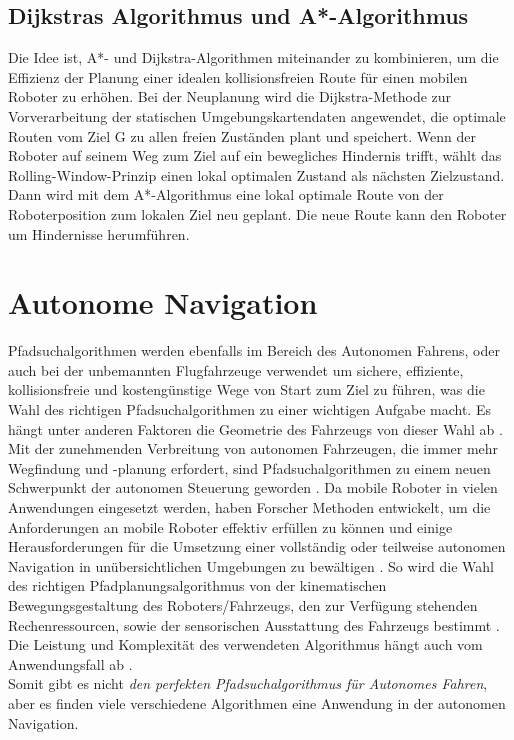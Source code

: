 \subsection{Dijkstras Algorithmus und A*-Algorithmus}

Die Idee ist, A*- und Dijkstra-Algorithmen miteinander zu kombinieren, um die Effizienz der Planung einer idealen kollisionsfreien Route für einen mobilen Roboter zu erhöhen. Bei der Neuplanung wird die Dijkstra-Methode zur Vorverarbeitung der statischen Umgebungskartendaten angewendet, die optimale Routen vom Ziel G zu allen freien Zuständen plant und speichert. Wenn der Roboter auf seinem Weg zum Ziel auf ein bewegliches Hindernis trifft, wählt das Rolling-Window-Prinzip einen lokal optimalen Zustand als nächsten Zielzustand. Dann wird mit dem A*-Algorithmus eine lokal optimale Route von der Roboterposition zum lokalen Ziel neu geplant.
Die neue Route kann den Roboter um Hindernisse herumführen\cite{Hong-mei17}.



\section{Autonome Navigation}
\label{Autonome Navigation}

Pfadsuchalgorithmen werden ebenfalls im Bereich des Autonomen Fahrens, oder auch bei der unbemannten Flugfahrzeuge verwendet
um sichere, effiziente, kollisionsfreie und kostengünstige Wege von Start zum Ziel zu führen, was die Wahl des richtigen Pfadsuchalgorithmen
zu einer wichtigen Aufgabe macht. Es hängt unter anderen Faktoren die Geometrie des Fahrzeugs von dieser Wahl ab \cite{Karur:21}.
Mit der zunehmenden Verbreitung von autonomen Fahrzeugen, die immer mehr Wegfindung und -planung erfordert, sind Pfadsuchalgorithmen
zu einem neuen Schwerpunkt der autonomen Steuerung geworden \cite{Karur:21}.
Da mobile Roboter in vielen Anwendungen eingesetzt werden, haben Forscher Methoden entwickelt, um die 
Anforderungen an mobile Roboter effektiv erfüllen zu können und einige Herausforderungen für die Umsetzung einer vollständig oder
teilweise autonomen Navigation in unübersichtlichen Umgebungen zu bewältigen \cite{Karur:21}.
So wird die Wahl des richtigen Pfadplanungsalgorithmus von der kinematischen Bewegungsgestaltung des Roboters/Fahrzeugs,
den zur Verfügung stehenden Rechenressourcen, sowie der sensorischen Ausstattung des Fahrzeugs bestimmt \cite{Karur:21}.
\noindent \\
Die Leistung und Komplexität des verwendeten Algorithmus hängt auch vom Anwendungsfall ab \cite{Karur:21}. \\
Somit gibt es nicht \emph{den perfekten Pfadsuchalgorithmus für Autonomes Fahren}, aber es finden viele verschiedene Algorithmen eine 
Anwendung in der autonomen Navigation.
